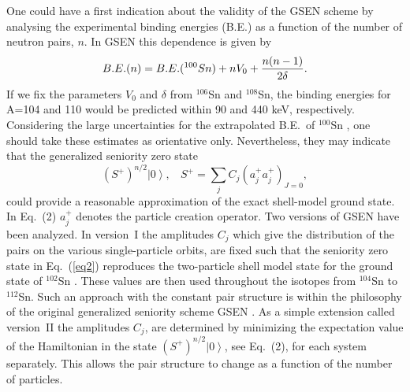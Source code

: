 One could have a first indication about the validity of the GSEN scheme 
by analysing the experimental binding energies (B.E.) as a function of the
number of neutron pairs, $n$. 
In GSEN this dependence is given by  \cite{Talmi71}
\begin{equation}\label{eq:be}
     B.E.(n) = B.E.(^{100}Sn)+nV_0 + {n(n-1)\over 2\delta}.
\end{equation}
If we fix the parameters $V_0$ and $\delta$ from
 $^{106}$Sn and $^{108}$Sn, the binding energies for A=104 and 110
would be  predicted within 90 and 440 keV, respectively. Considering
the large uncertainties  for the extrapolated B.E.\ 
of $^{100}$Sn  \cite{Wapstra93}, one should take these
estimates as orientative only. 
Nevertheless, they  may indicate that
the generalized seniority zero state
\begin{equation}\label{eq:sen0}
 (S^+)^{n/2} \left | 0\right \rangle , ~~~~  
        S^+ = \sum_{j} C_j(a^+_j a^+_j)_{J = 0},
\label{eq2}    
\end{equation}
could provide a reasonable approximation of the exact shell-model 
ground state.
In Eq.\ (2)  $a^+_j$ denotes 
the particle creation operator.
Two versions of GSEN  have been analyzed. In version~I the amplitudes $C_j$
which give the distribution of the pairs on the 
various single-particle orbits, 
are fixed such that the seniority zero state in Eq.~(\ref{eq2}) 
reproduces the two-particle
shell model state for the ground state of $^{102}$Sn . 
These values are then used  throughout the isotopes from
$^{104}$Sn to $^{112}$Sn. Such an  approach with the constant pair structure 
is within the philosophy
of the original generalized seniority scheme GSEN \cite{Talmi71}. As a simple 
extension called version~II  the amplitudes $C_j$, 
are determined  by minimizing 
the expectation value of the Hamiltonian in 
the state $ (S^+)^{n/2} \left | 0\right \rangle$,
see Eq.~(2),
for each system separately. This allows the pair structure to change
as a function of the number of particles. 

